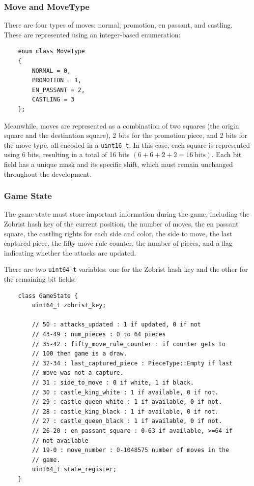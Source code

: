 \subsubsection{Move and MoveType}

There are four types of moves: normal, promotion, en passant, and castling. These are represented using an integer-based enumeration:

\begin{lstlisting}
    enum class MoveType
    {
        NORMAL = 0,
        PROMOTION = 1,
        EN_PASSANT = 2,
        CASTLING = 3
    };
\end{lstlisting}

\noindent Meanwhile, moves are represented as a combination of two squares (the origin square and the destination square), 2 bits for the promotion piece, and 2 bits for the move type, all encoded in a \texttt{uint16\_t}. In this case, each square is represented using 6 bits, resulting in a total of 16 bits $(6 + 6 + 2 + 2 = 16~\mathrm{bits})$. Each bit field has a unique mask and its specific shift, which must remain unchanged throughout the development.

\subsubsection{Game State}

The game state must store important information during the game, including the Zobrist hash key of the current position, the number of moves, the en passant square, the castling rights for each side and color, the side to move, the last captured piece, the fifty-move rule counter, the number of pieces, and a flag indicating whether the attacks are updated.

\vspace{1em}

\noindent There are two \texttt{uint64\_t} variables: one for the Zobrist hash key and the other for the remaining bit fields:

\begin{lstlisting}
    class GameState {
        uint64_t zobrist_key;

        // 50 : attacks_updated : 1 if updated, 0 if not
        // 43-49 : num_pieces : 0 to 64 pieces
        // 35-42 : fifty_move_rule_counter : if counter gets to 
        // 100 then game is a draw.
        // 32-34 : last_captured_piece : PieceType::Empty if last
        // move was not a capture.
        // 31 : side_to_move : 0 if white, 1 if black.
        // 30 : castle_king_white : 1 if available, 0 if not.
        // 29 : castle_queen_white : 1 if available, 0 if not.
        // 28 : castle_king_black : 1 if available, 0 if not.
        // 27 : castle_queen_black : 1 if available, 0 if not.
        // 26-20 : en_passant_square : 0-63 if available, >=64 if
        // not available
        // 19-0 : move_number : 0-1048575 number of moves in the 
        // game.
        uint64_t state_register;
    }
\end{lstlisting}

